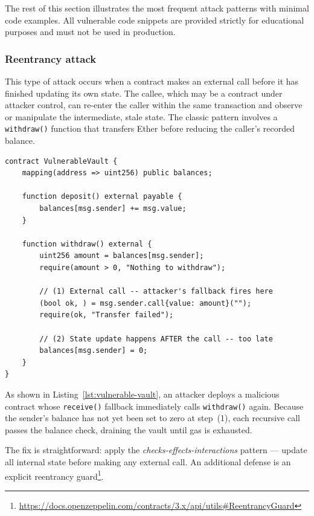 The rest of this section illustrates the most frequent attack patterns with minimal code examples. All vulnerable code snippets are provided strictly for educational purposes and must not be used in production.

\subsubsection*{Reentrancy attack}
This type of attack occurs when a contract makes an external call before it has finished updating its own state. The callee, which may be a contract under attacker control, can re-enter the caller within the same transaction and observe or manipulate the intermediate, stale state. The classic pattern involves a \texttt{withdraw()} function that transfers Ether before reducing the caller's recorded balance.

\begin{listing}[!ht]
\begin{verbatim}
contract VulnerableVault {
    mapping(address => uint256) public balances;

    function deposit() external payable {
        balances[msg.sender] += msg.value;
    }

    function withdraw() external {
        uint256 amount = balances[msg.sender];
        require(amount > 0, "Nothing to withdraw");

        // (1) External call -- attacker's fallback fires here
        (bool ok, ) = msg.sender.call{value: amount}("");
        require(ok, "Transfer failed");

        // (2) State update happens AFTER the call -- too late
        balances[msg.sender] = 0;
    }
}
\end{verbatim}
\caption[Vulnerable vault contract.]{Vulnerable vault contract susceptible to reentrancy.}
\label{lst:vulnerable-vault}
\end{listing}

As shown in Listing~\ref{lst:vulnerable-vault}, an attacker deploys a malicious contract whose \texttt{receive()} fallback immediately calls \texttt{withdraw()} again. Because the sender's balance has not yet been set to zero at step~(1), each recursive call passes the balance check, draining the vault until gas is exhausted.

The fix is straightforward: apply the \emph{checks-effects-interactions} pattern --- update all internal state before making any external call. An additional defense is an explicit reentrancy guard\footnote{\url{https://docs.openzeppelin.com/contracts/3.x/api/utils\#ReentrancyGuard}}.

